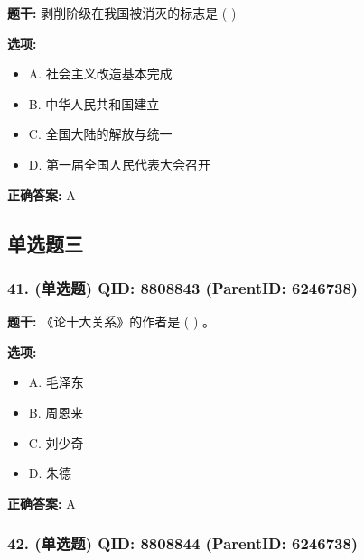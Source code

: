 \documentclass[12pt,UTF8]{ctexart}
\begin{document}
\textbf{题干:}
剥削阶级在我国被消灭的标志是  ( )



\textbf{选项:}
\begin{itemize}[leftmargin=*]

  \item A. 社会主义改造基本完成

  \item B. 中华人民共和国建立

  \item C. 全国大陆的解放与统一

  \item D. 第一届全国人民代表大会召开

\end{itemize}

\textbf{正确答案:}
A

\vspace{0.3em}\hrulefill\vspace{0.7em}

\subsection*{单选题三}

\subsubsection*{41. (单选题) \small QID: 8808843 (ParentID: 6246738)}

\textbf{题干:}
《论十大关系》的作者是 ( ) 。



\textbf{选项:}
\begin{itemize}[leftmargin=*]

  \item A. 毛泽东

  \item B. 周恩来

  \item C. 刘少奇

  \item D. 朱德

\end{itemize}

\textbf{正确答案:}
A

\vspace{0.3em}\hrulefill\vspace{0.7em}

\subsubsection*{42. (单选题) \small QID: 8808844 (ParentID: 6246738)}
\end{document}
